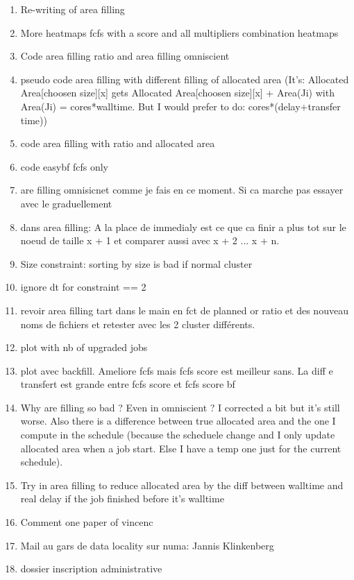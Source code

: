 \documentclass[a4paper]{article}
\begin{document}
	\begin{enumerate}
		\item Re-writing of area filling
		\item More heatmaps fcfs with a score and all multipliers combination heatmaps
		\item Code area filling ratio and area filling omniscient
		\item pseudo code area filling with different filling of allocated area (It's: Allocated Area[choosen size][x] gets Allocated Area[choosen size][x] + Area(Ji) with Area(Ji) = cores*walltime. But I would prefer to do: cores*(delay+transfer time))
		\item code area filling with ratio and allocated area
		\item code easybf fcfs only
		\item are filling omnisicnet comme je fais en ce moment. Si ca marche pas essayer avec le graduellement
		\item dans area filling: A la place de immedialy est ce que ca finir a plus tot sur le noeud de taille x + 1 et comparer aussi avec x + 2 ... x + n.
		\item Size constraint: sorting by size is bad if normal cluster
		\item ignore dt for constraint == 2
		\item revoir area filling tart dans le main en fct de planned or ratio et des nouveau noms de fichiers et retester avec les 2 cluster différents.
		\item plot with nb of upgraded jobs
		\item plot avec backfill. Ameliore fcfs mais fcfs score est meilleur sans. La diff e transfert est grande entre fcfs score et fcfs score bf
		\item Why are filling so bad ? Even in omniscient ? I corrected a bit but it's still worse. Also there is a difference between true allocated area and the one I compute in the schedule (because the scheduele change and I only update allocated area when a job start. Else I have a temp one just for the current schedule).
		\item Try in area filling to reduce allocated area by the diff between walltime and real delay if the job finished before it's walltime
		\item Comment one paper of vincenc
		\item Mail au gars de data locality sur numa: Jannis Klinkenberg
		\item dossier inscription administrative

\end{enumerate}
\end{document}

